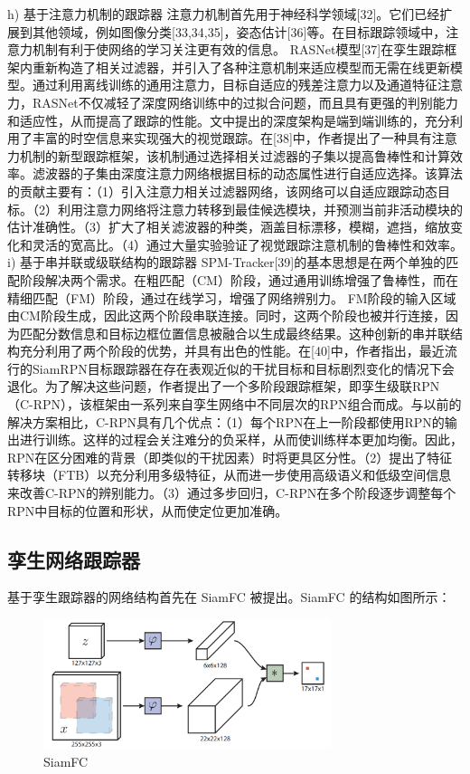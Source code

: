 h)	基于注意力机制的跟踪器
注意力机制首先用于神经科学领域[32]。它们已经扩展到其他领域，例如图像分类[33,34,35]，姿态估计[36]等。在目标跟踪领域中，注意力机制有利于使网络的学习关注更有效的信息。	RASNet模型[37]在孪生跟踪框架内重新构造了相关过滤器，并引入了各种注意机制来适应模型而无需在线更新模型。通过利用离线训练的通用注意力，目标自适应的残差注意力以及通道特征注意力，RASNet不仅减轻了深度网络训练中的过拟合问题，而且具有更强的判别能力和适应性，从而提高了跟踪的性能。文中提出的深度架构是端到端训练的，充分利用了丰富的时空信息来实现强大的视觉跟踪。在[38]中，作者提出了一种具有注意力机制的新型跟踪框架，该机制通过选择相关过滤器的子集以提高鲁棒性和计算效率。滤波器的子集由深度注意力网络根据目标的动态属性进行自适应选择。该算法的贡献主要有：（1）引入注意力相关过滤器网络，该网络可以自适应跟踪动态目标。（2）利用注意力网络将注意力转移到最佳候选模块，并预测当前非活动模块的估计准确性。（3）扩大了相关滤波器的种类，涵盖目标漂移，模糊，遮挡，缩放变化和灵活的宽高比。（4）通过大量实验验证了视觉跟踪注意机制的鲁棒性和效率。
i)	基于串并联或级联结构的跟踪器
SPM-Tracker[39]的基本思想是在两个单独的匹配阶段解决两个需求。在粗匹配（CM）阶段，通过通用训练增强了鲁棒性，而在精细匹配（FM）阶段，通过在线学习，增强了网络辨别力。 FM阶段的输入区域由CM阶段生成，因此这两个阶段串联连接。同时，这两个阶段也被并行连接，因为匹配分数信息和目标边框位置信息被融合以生成最终结果。这种创新的串并联结构充分利用了两个阶段的优势，并具有出色的性能。在[40]中，作者指出，最近流行的SiamRPN目标跟踪器在存在表观近似的干扰目标和目标剧烈变化的情况下会退化。为了解决这些问题，作者提出了一个多阶段跟踪框架，即孪生级联RPN（C-RPN），该框架由一系列来自孪生网络中不同层次的RPN组合而成。与以前的解决方案相比，C-RPN具有几个优点：（1）每个RPN在上一阶段都使用RPN的输出进行训练。这样的过程会关注难分的负采样，从而使训练样本更加均衡。因此，RPN在区分困难的背景（即类似的干扰因素）时将更具区分性。（2）提出了特征转移块（FTB）以充分利用多级特征，从而进一步使用高级语义和低级空间信息来改善C-RPN的辨别能力。（3）通过多步回归，C-RPN在多个阶段逐步调整每个RPN中目标的位置和形状，从而使定位更加准确。

\subsection{孪生网络跟踪器}
基于孪生跟踪器的网络结构首先在 SiamFC 被提出。SiamFC 的结构如图所示：

\begin{figure}
\centering
\includegraphics[width=0.75\textwidth]{Img/related/SiamFC.png}
\caption{SiamFC}
\end{figure}

